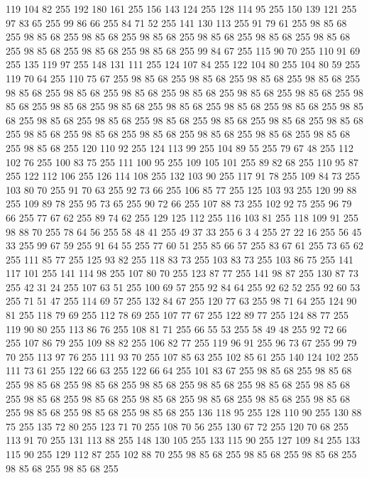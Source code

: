 119 104 82 255 192 180 161 255 156 143 124 255 128 114 95 255 150 139 121 255 97 83 65 255 99 86 66 255 84 71 52 255 141 130 113 255 91 79 61 255 98 85 68 255 98 85 68 255 98 85 68 255 98 85 68 255 98 85 68 255 98 85 68 255 98 85 68 255 98 85 68 255 98 85 68 255 98 85 68 255 99 84 67 255 115 90 70 255 110 91 69 255 135 119 97 255 148 131 111 255 124 107 84 255 122 104 80 255 104 80 59 255 119 70 64 255 110 75 67 255 98 85 68 255 98 85 68 255 98 85 68 255 98 85 68 255 98 85 68 255 98 85 68 255 98 85 68 255 98 85 68 255 98 85 68 255 98 85 68 255 98 85 68 255 98 85 68 255 98 85 68 255 98 85 68 255 98 85 68 255 98 85 68 255 98 85 68 255 98 85 68 255 98 85 68 255 98 85 68 255 98 85 68 255 98 85 68 255 98 85 68 255 98 85 68 255 98 85 68 255 98 85 68 255 98 85 68 255 98 85 68 255 98 85 68 255 98 85 68 255 120 110 92 255 124 113 99 255 104 89 55 255 79 67 48 255
112 102 76 255 100 83 75 255 111 100 95 255 109 105 101 255 89 82 68 255 110 95 87 255 122 112 106 255 126 114 108 255 132 103 90 255 117 91 78 255 109 84 73 255 103 80 70 255 91 70 63 255 92 73 66 255 106 85 77 255 125 103 93 255 120 99 88 255 109 89 78 255 95 73 65 255 90 72 66 255 107 88 73 255 102 92 75 255 96 79 66 255 77 67 62 255 89 74 62 255 129 125 112 255 116 103 81 255 118 109 91 255 98 88 70 255 78 64 56 255 58 48 41 255 49 37 33 255 6 3 4 255 27 22 16 255 56 45 33 255 99 67 59 255 91 64 55 255 77 60 51 255 85 66 57 255 83 67 61 255 73 65 62 255 111 85 77 255 125 93 82 255 118 83 73 255 103 83 73 255 103 86 75 255 141 117 101 255 141 114 98 255 107 80 70 255 123 87 77 255 141 98 87 255 130 87 73 255 42 31 24 255 107 63 51 255 100 69 57 255 92 84 64 255 92 62 52 255 92 60 53 255 71 51 47 255 114 69 57 255 132 84 67 255 120 77 63 255 98 71 64 255 124 90 81 255
118 79 69 255 112 78 69 255 107 77 67 255 122 89 77 255 124 88 77 255 119 90 80 255 113 86 76 255 108 81 71 255 66 55 53 255 58 49 48 255 92 72 66 255 107 86 79 255 109 88 82 255 106 82 77 255 119 96 91 255 96 73 67 255 99 79 70 255 113 97 76 255 111 93 70 255 107 85 63 255 102 85 61 255 140 124 102 255 111 73 61 255 122 66 63 255 122 66 64 255 101 83 67 255 98 85 68 255 98 85 68 255 98 85 68 255 98 85 68 255 98 85 68 255 98 85 68 255 98 85 68 255 98 85 68 255 98 85 68 255 98 85 68 255 98 85 68 255 98 85 68 255 98 85 68 255 98 85 68 255 98 85 68 255 98 85 68 255 98 85 68 255 136 118 95 255 128 110 90 255 130 88 75 255 135 72 80 255 123 71 70 255 108 70 56 255 130 67 72 255 120 70 68 255 113 91 70 255 131 113 88 255 148 130 105 255 133 115 90 255 127 109 84 255 133 115 90 255 129 112 87 255 102 88 70 255 98 85 68 255 98 85 68 255 98 85 68 255 98 85 68 255 98 85 68 255
